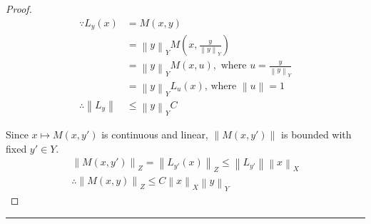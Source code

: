 \documentclass{article}
\newcommand{\norm}[1]{\left\|#1\right\|}
\begin{document}
\begin{proof}
\begin{align}
    \because L_y(x)
    &= M(x, y)
    \\
    &= \norm{y}_Y M(x, \frac{y}{\norm{y}_Y})
    \\
    &= \norm{y}_Y M(x, u),
    \text{ where } 
    u = \frac{y}{\norm{y}_Y}
    \\
    &= \norm{y}_Y L_{u}(x)
    \text{, where } 
    \norm{u} = 1
    \\
    \therefore \norm{L_y}
    &\leq \norm{y}_Y C
\end{align}

Since $ x \mapsto M(x,y')$ is continuous and linear, $\norm{M(x,y')}$ is bounded with fixed $y' \in Y$.
\begin{align}
    \norm{M(x,y')}_Z
    = 
    \norm{L_{y'}(x)}_Z
    \leq \norm{L_{y'}} \norm{x}_X
    \\
    \therefore
    \norm{M(x, y)}_Z 
    \leq C \norm{x}_X \norm{y}_Y
\end{align}

\end{proof}

\hrule
\vspace{0.5em}

\end{document}
